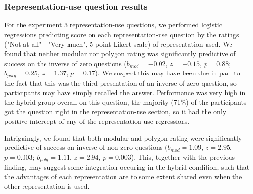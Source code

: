 \documentclass[man,mask,10pt]{apa6}
\begin{document}
\subsubsection{Representation-use question results}
For the experiment 3 representation-use questions, we performed logistic regressions predicting score on each representation-use question by the ratings ("Not at all" - "Very much", 5 point Likert scale) of representation used. We found that neither modular nor polygon rating was significantly predictive of success on the inverse of zero questions ($b_{mod} = -0.02$, $z = -0.15$, $p = 0.88$; $b_{poly} = 0.25$, $z = 1.37$, $p = 0.17$). We suspect this may have been due in part to the fact that this was the third presentation of an inverse of zero question, so participants may have simply recalled the answer. Performance was very high in the hybrid group overall on this question, the majority (71\%) of the participants got the question right in the representation-use section, so it had the only positive intercept of any of the representation-use regressions.\par 
Intriguingly, we found that both modular and polygon rating were significantly predictive of success on inverse of non-zero questions ($b_{mod} = 1.09$, $z = 2.95$, $p = 0.003$; $b_{poly} = 1.11$, $z = 2.94$, $p = 0.003$). This, together with the previous finding, may suggest some integration occuring in the hybrid condition, such that the advantages of each representation are to some extent shared even when the other representation is used. 
\end{document}

